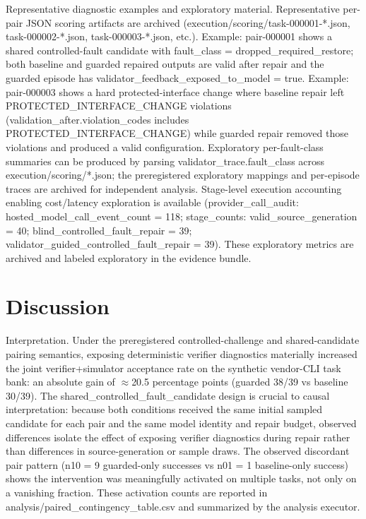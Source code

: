 \documentclass[conference]{IEEEtran}
\begin{document}
Representative diagnostic examples and exploratory material. Representative per-pair JSON scoring artifacts are archived (execution/scoring/task-000001-*.json, task-000002-*.json, task-000003-*.json, etc.). Example: pair-000001 shows a shared controlled-fault candidate with fault\_class = dropped\_required\_restore; both baseline and guarded repaired outputs are valid after repair and the guarded episode has validator\_feedback\_exposed\_to\_model = true. Example: pair-000003 shows a hard protected-interface change where baseline repair left PROTECTED\_INTERFACE\_CHANGE violations (validation\_after.violation\_codes includes PROTECTED\_INTERFACE\_CHANGE) while guarded repair removed those violations and produced a valid configuration. Exploratory per-fault-class summaries can be produced by parsing validator\_trace.fault\_class across execution/scoring/*.json; the preregistered exploratory mappings and per-episode traces are archived for independent analysis. Stage-level execution accounting enabling cost/latency exploration is available (provider\_call\_audit: hosted\_model\_call\_event\_count = 118; stage\_counts: valid\_source\_generation = 40; blind\_controlled\_fault\_repair = 39; validator\_guided\_controlled\_fault\_repair = 39). These exploratory metrics are archived and labeled exploratory in the evidence bundle.

\section{Discussion}
Interpretation. Under the preregistered controlled-challenge and shared-candidate pairing semantics, exposing deterministic verifier diagnostics materially increased the joint verifier+simulator acceptance rate on the synthetic vendor-CLI task bank: an absolute gain of \ensuremath{\approx}20.5 percentage points (guarded 38/39 vs baseline 30/39). The shared\_controlled\_fault\_candidate design is crucial to causal interpretation: because both conditions received the same initial sampled candidate for each pair and the same model identity and repair budget, observed differences isolate the effect of exposing verifier diagnostics during repair rather than differences in source-generation or sample draws. The observed discordant pair pattern (n10 = 9 guarded-only successes vs n01 = 1 baseline-only success) shows the intervention was meaningfully activated on multiple tasks, not only on a vanishing fraction. These activation counts are reported in analysis/paired\_contingency\_table.csv and summarized by the analysis executor.
\end{document}
